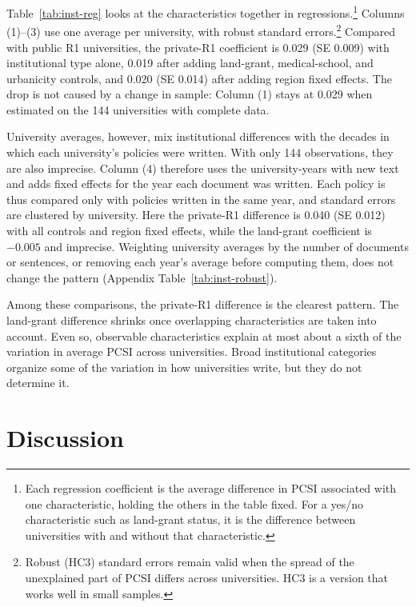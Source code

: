 \documentclass[11pt]{article}
\begin{document}


Table~\ref{tab:inst-reg} looks at the characteristics together in regressions.\footnote{Each regression coefficient is the average difference in PCSI associated with one characteristic, holding the others in the table fixed. For a yes/no characteristic such as land-grant status, it is the difference between universities with and without that characteristic.} Columns (1)--(3) use one average per university, with robust standard errors.\footnote{Robust (HC3) standard errors remain valid when the spread of the unexplained part of PCSI differs across universities. HC3 is a version that works well in small samples.} Compared with public R1 universities, the private-R1 coefficient is 0.029 (SE 0.009) with institutional type alone, 0.019 after adding land-grant, medical-school, and urbanicity controls, and 0.020 (SE 0.014) after adding region fixed effects. The drop is not caused by a change in sample: Column (1) stays at 0.029 when estimated on the 144 universities with complete data.

University averages, however, mix institutional differences with the decades in which each university's policies were written. With only 144 observations, they are also imprecise. Column (4) therefore uses the university-years with new text and adds fixed effects for the year each document was written. Each policy is thus compared only with policies written in the same year, and standard errors are clustered by university. Here the private-R1 difference is 0.040 (SE 0.012) with all controls and region fixed effects, while the land-grant coefficient is $-0.005$ and imprecise. Weighting university averages by the number of documents or sentences, or removing each year's average before computing them, does not change the pattern (Appendix Table~\ref{tab:inst-robust}).



Among these comparisons, the private-R1 difference is the clearest pattern. The land-grant difference shrinks once overlapping characteristics are taken into account. Even so, observable characteristics explain at most about a sixth of the variation in average PCSI across universities. Broad institutional categories organize some of the variation in how universities write, but they do not determine it.

\section{Discussion}\label{sec:discussion}
\end{document}
